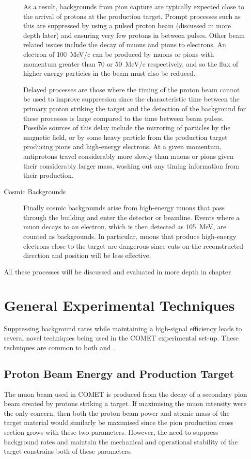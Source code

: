 \begin{description}
As a result, backgrounds from pion capture are typically expected close to the arrival of protons at the production target.
Prompt processes such as this are suppressed by using a pulsed proton beam (discussed in more depth later) and ensuring very few protons in between pulses.
Other beam related issues include the decay of muons and pions to electrons.
An electron of 100~MeV/c can be produced by muons or pions with momentum greater than 70 or 50~MeV/c respectively, and so the flux of higher energy particles in the beam must also be reduced.

Delayed processes are those where the timing of the proton beam cannot be used to improve suppression since the characteristic time between the primary proton striking the target and the detection of the background for these processes is large compared to the time between beam pulses.
Possible sources of this delay include the mirroring of particles by the magnetic field, or by some heavy particle from the production target producing pions and high-energy electrons.
At a given momentum, antiprotons travel considerably more slowly than muons or pions given their considerably larger mass, washing out any timing information from their production.

\item [Cosmic Backgrounds]
Finally cosmic backgrounds arise from high-energy muons that pass through the building and enter the detector or beamline.  
Events where a muon decays to an electron, which is then detected as 105~MeV, are counted as backgrounds.
In particular, muons that produce high-energy electrons close to the target are dangerous since cuts on the reconstructed direction and position will be less effective.
\end{description}

All these processes will be discussed and evaluated in more depth in chapter~
\TabBackgroundSummary%

\section{General Experimental Techniques}
Suppressing background rates while maintaining a high-signal efficiency leads to several novel techniques being used in the COMET experimental set-up.
These techniques are common to both \phaseI and \phaseII.

\subsection{Proton Beam Energy and Production Target}
The muon beam used in COMET is produced from the decay of a secondary pion beam created by protons striking a target.
If maximising the muon intensity were the only concern, then both the proton beam power and atomic mass of the target material would similarly be maximised since the pion production cross section
grows with these two parameters.
However, the need to suppress background rates and maintain the mechanical and operational stability of the target constrains both of these parameters.

